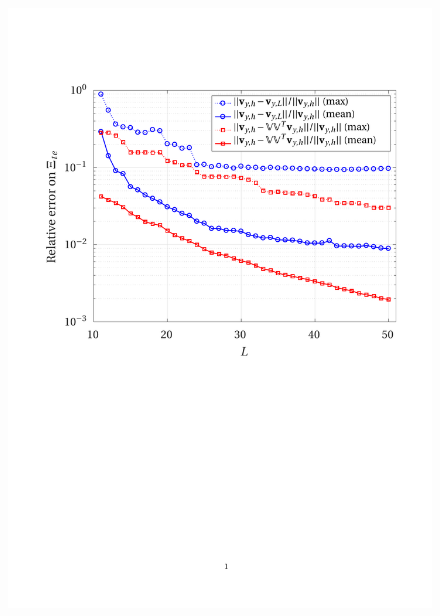 \documentclass[12pt, a4paper, twoside, openright]{report}
\numberwithin{equation}{chapter}
\theoremstyle{theorem}
\theoremstyle{definition}
\theoremstyle{remark}
\theoremstyle{proposition}
\numberwithin{figure}{chapter}
\begin{document}
	\begin{figure}[H]
		\center
		\includegraphics[scale = 0.75, trim = {1.5cm 12cm 1cm 3.5cm}, clip]{dc_200_vy_error_vs_rank}
	\end{figure}
	
\end{document}
